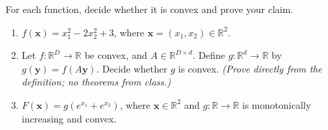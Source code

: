 \documentclass[en,hazy,blue,12pt,normal]{../../elegantnote}
\begin{document}
\begin{homework}
For each function, decide whether it is convex and prove your claim.
\begin{enumerate}
    \item[(a)] $f(\bm x)=x_1^2-2x_2^2+3$, where $\bm x=(x_1,x_2)\in\mathbb R^2$.
    \item[(b)] Let $f:\mathbb R^D\to\mathbb R$ be convex, and $A\in\mathbb R^{D\times d}$. Define
        $g:\mathbb R^d\to\mathbb R$ by $g(\bm y)=f(A\bm y)$. Decide whether $g$ is convex.
        \emph{(Prove directly from the definition; no theorems from class.)}
    \item[(c)] $F(\bm x)=g(e^{x_1}+e^{x_2})$, where $\bm x\in\mathbb R^2$ and $g:\mathbb R\to\mathbb R$
        is monotonically increasing and convex.
\end{enumerate}
\end{homework}
\end{document}
